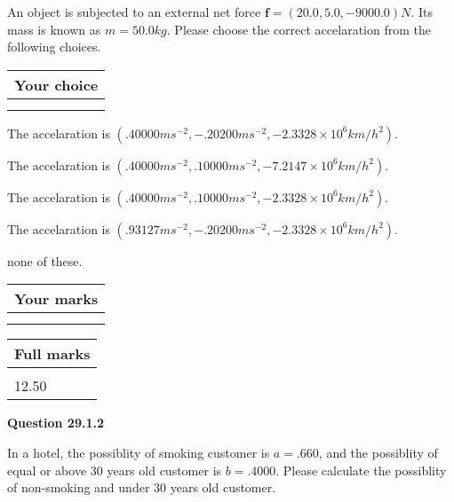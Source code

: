 \documentclass[12pt]{article}
\begin{document}
  
 
An object is subjected to an external net force $\mathbf{f}=(
20.0 ,
5.0,
-9000.0  )N$. Its mass is known as
$m= %
50.0  kg$. Please choose the correct accelaration
from the following choices.
 
  
  
\noindent\hspace{3.0in} \begin{tabular}{|l|}
\hline
Your choice \\
\hline
 \\ 
 \\ 
\hline
\end{tabular}
  
  
 
 
The accelaration is
$(
.40000ms^{-2},
-.20200ms^{-2},
-2.3328 \times 10^{6}km/h^2
).
$
 
 
The accelaration is
$(
.40000ms^{-2},
.10000ms^{-2},
-7.2147 \times 10^{6}km/h^2
).
$
 
 
The accelaration is
$(
.40000ms^{-2},
.10000ms^{-2},
-2.3328 \times 10^{6}km/h^2
).
$
 
 
The accelaration is
$(
.93127ms^{-2},
-.20200ms^{-2},
-2.3328 \times 10^{6}km/h^2
).
$
 
 
none of these.
 
 
 
 

 
\vspace{0.3in}
  
\vspace{0.2in}
  
         \begin{tabular}{|l|}
\hline
 Your marks  \\
\hline
 \\ 
 \\ 
\hline
\end{tabular}
\hspace{0.05in} \begin{tabular}{|l|}
\hline
 Full marks  \\
\hline
 \\ 
12.50 \\
\hline
\end{tabular}
{\textbf{\Large{Question
29.1.2 
}}}
  
  
In a hotel, the possiblity of  %
smoking customer is
$a =  %
.660$, and the possiblity of  %
equal or above 30 years old customer is $ b =  %
.4000$.
Please calculate the possiblity of  %
 non-smoking and  %
under 30 years old customer.
 
\end{document}
